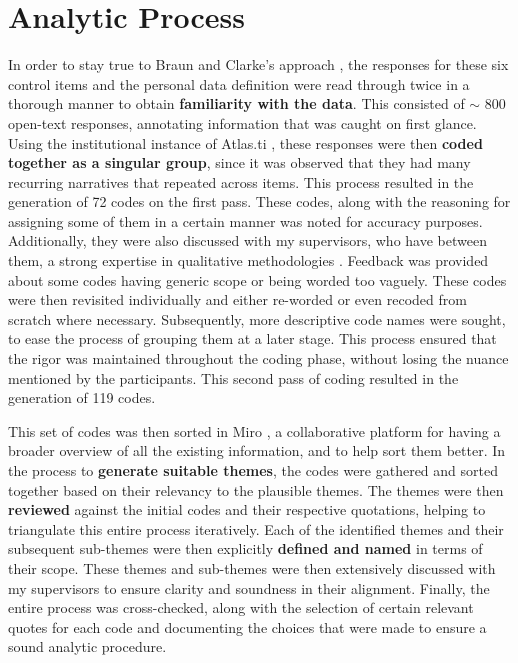 \section{Analytic Process} \label{sec:qual analysis}

In order to stay true to Braun and Clarke's approach \cite{braun_using_2006}, the responses for these six control items and the personal data definition were read through twice in a thorough manner to obtain \textbf{familiarity with the data}. This consisted of $\sim$ 800 open-text responses, annotating information that was caught on first glance. Using the institutional instance of Atlas.ti \cite{atlasti}, these responses were then \textbf{coded together as a singular group}, since it was observed that they had many recurring narratives that repeated across items. This process resulted in the generation of 72 codes on the first pass. These codes, along with the reasoning for assigning some of them in a certain manner was noted for accuracy purposes. Additionally, they were also discussed with my supervisors, who have between them, a strong expertise in qualitative methodologies \cite{braun2021one}. Feedback was provided about some codes having generic scope or being worded too vaguely. These codes were then revisited individually and either re-worded or even recoded from scratch where necessary. Subsequently, more descriptive code names were sought, to ease the process of grouping them at a later stage. This process ensured that the rigor was maintained throughout the coding phase, without losing the nuance mentioned by the participants. This second pass of coding resulted in the generation of 119 codes. 

This set of codes was then sorted in Miro \cite{miro}, a collaborative platform for having a broader overview of all the existing information, and to help sort them better. In the process to \textbf{generate suitable themes}, the codes were gathered and sorted together based on their relevancy to the plausible themes. The themes were then \textbf{reviewed} against the initial codes and their respective quotations, helping to triangulate this entire process iteratively. Each of the identified themes and their subsequent sub-themes were then explicitly \textbf{defined and named} in terms of their scope. These themes and sub-themes were then extensively discussed with my supervisors to ensure clarity and soundness in their alignment. Finally, the entire process was cross-checked, along with the selection of certain relevant quotes for each code and documenting the choices that were made to ensure a sound analytic procedure. 


